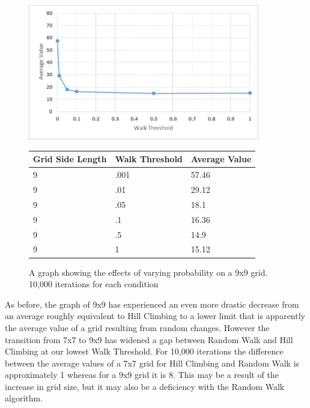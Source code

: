 \documentclass[12pt]{article}
\begin{document}
 \begin{figure}[H]
    \centering
    \includegraphics[width=0.9\textwidth]{9x9_RWprob}
\begin{tabular}{ |p{4cm}||p{4cm}|p{4cm}|  }
 \hline
Grid Side Length&Walk Threshold&Average Value\\
 \hline
9&.001&57.46\\
9&.01&29.12\\
9&.05&18.1\\
9&.1&16.36\\
9&.5&14.9\\
9&1&15.12\\
 \hline
\end{tabular}
    \caption{A graph showing the effects of varying probability on a 9x9 grid. 10,000 iterations for each condition}
    \label{fig:RWprob9x9}
\end{figure}
 
As before, the graph of 9x9 has experienced an even more drastic decrease from an average roughly equivalent to Hill Climbing to a lower limit that is apparently the average value of a grid resulting from random changes. However the transition from 7x7 to 9x9 has widened a gap between Random Walk and Hill Climbing at our lowest Walk Threshold. For 10,000 iterations the difference between the average values of a 7x7 grid for Hill Climbing and Random Walk is approximately 1 whereas for a 9x9 grid it is 8. This may be a result of the increase in grid size, but it may also be a deficiency with the Random Walk algorithm. 
\end{document}
